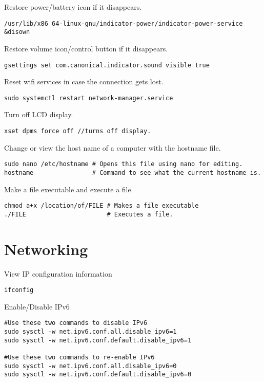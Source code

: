 Restore power/battery icon if it disappears.
\begin{lstlisting}
/usr/lib/x86_64-linux-gnu/indicator-power/indicator-power-service &disown 
\end{lstlisting}

Restore volume icon/control button if it disappears.
\begin{lstlisting}
gsettings set com.canonical.indicator.sound visible true
\end{lstlisting}

Reset wifi services in case the connection gets lost.
\begin{lstlisting}
sudo systemctl restart network-manager.service
\end{lstlisting}

Turn off LCD display.
\begin{lstlisting}
xset dpms force off //turns off display.
\end{lstlisting}

Change or view the host name of a computer with the hostname file.
\begin{lstlisting}
sudo nano /etc/hostname # Opens this file using nano for editing.
hostname                # Command to see what the current hostname is.
\end{lstlisting}

Make a file executable and execute a file
\begin{lstlisting}
chmod a+x /location/of/FILE # Makes a file executable
./FILE                      # Executes a file.
\end{lstlisting}

\section{Networking}

View IP configuration information
\begin{lstlisting}
ifconfig
\end{lstlisting}

Enable/Disable IPv6
\begin{lstlisting}
#Use these two commands to disable IPv6
sudo sysctl -w net.ipv6.conf.all.disable_ipv6=1
sudo sysctl -w net.ipv6.conf.default.disable_ipv6=1

#Use these two commands to re-enable IPv6
sudo sysctl -w net.ipv6.conf.all.disable_ipv6=0
sudo sysctl -w net.ipv6.conf.default.disable_ipv6=0
\end{lstlisting}